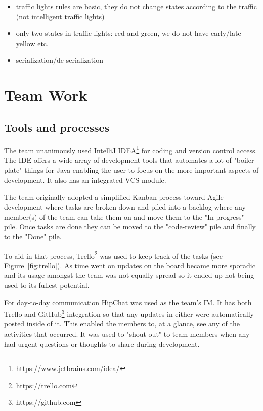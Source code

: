\begin{itemize}
        \item traffic lights rules are basic, they do not change states according to the traffic (not intelligent traffic lights)
        \item only two states in traffic lights: red and green, we do not have early/late yellow etc.
\end{itemize}
     
\begin{itemize}
	\item serialization/de-serialization
\end{itemize}

\section{Team Work}

\subsection{Tools and processes}

The team unanimously used IntelliJ IDEA\footnote{https://www.jetbrains.com/idea/} for coding and version control access. The IDE offers a wide array of development tools that automates a lot of "boiler-plate" things for Java enabling the user to focus on the more important aspects of development. It also has an integrated VCS module.

The team originally adopted a simplified Kanban\cite{Peterson2015, Radig2016} process toward Agile development where tasks are broken down and piled into a backlog where any member(s) of the team can take them on and move them to the "In progress" pile. Once tasks are done they can be moved to the "code-review" pile and finally to the "Done" pile.

To aid in that process, Trello\footnote{https://trello.com} was used to keep track of the tasks (see Figure~\ref{fig:trello}). As time went on updates on the board became more sporadic and its usage amongst the team was not equally spread so it ended up not being used to its fullest potential. 

For day-to-day communication HipChat was used as the team's IM. It has both Trello and GitHub\footnote{https://github.com} integration so that any updates in either were automatically posted inside of it. This enabled the members to, at a glance, see any of the activities that occurred. It was used to "shout out" to team members when any had urgent questions or thoughts to share during development.


